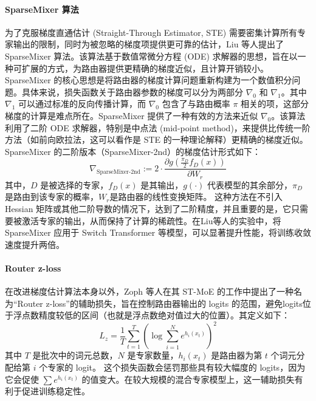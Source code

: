 \paragraph{SparseMixer 算法}
为了克服梯度直通估计 (Straight-Through Estimator, STE) 需要密集计算所有专家输出的限制，同时为被忽略的梯度项提供更可靠的估计，Liu 等人提出了 SparseMixer 算法\cite{liu2023sparsebackpropagationmoetraining}。该算法基于数值常微分方程 (ODE) 求解器的思想，旨在以一种可扩展的方式，为路由器提供更精确的梯度近似，且计算开销较小。SparseMixer 的核心思想是将路由器的梯度计算问题重新构建为一个数值积分问题。具体来说，损失函数关于路由器参数的梯度可以分为两部分 $\nabla_0$ 和 $\nabla_1$。其中 $\nabla_1$ 可以通过标准的反向传播计算，而 $\nabla_0$ 包含了与路由概率 $\pi$ 相关的项，这部分梯度的计算是难点所在。SparseMixer 提供了一种有效的方法来近似 $\nabla_0$。该算法利用了二阶 ODE 求解器，特别是中点法 (mid-point method)，来提供比传统一阶方法（如前向欧拉法，这可以看作是 STE 的一种理论解释）更精确的梯度近似。SparseMixer 的二阶版本（SparseMixer-2nd）的梯度估计形式如下：
\begin{equation}
\nabla_{\text{SparseMixer-2nd}} := 2 \cdot \frac{\partial g(\frac{\pi_D}{2} f_D(x))}{\partial W_r}
\end{equation}
其中，$D$ 是被选择的专家，$f_D(x)$ 是其输出，$g(\cdot)$ 代表模型的其余部分，$\pi_D$ 是路由到该专家的概率，$W_r$是路由器的线性变换矩阵。 这种方法在不引入 Hessian 矩阵或其他二阶导数的情况下，达到了二阶精度，并且重要的是，它只需要被激活专家的输出，从而保持了计算的稀疏性。在Liu等人的实验中，将 SparseMixer 应用于 Switch Transformer 等模型，可以显著提升性能，将训练收敛速度提升两倍。

\paragraph{Router z-loss}
在改进梯度估计算法本身以外，Zoph 等人在其 ST-MoE 的工作中提出了一种名为“Router z-loss”的辅助损失\cite{Zoph2022STMoEDS}，旨在控制路由器输出的 logits 的范围，避免logits位于浮点数精度较低的区间（也就是浮点数绝对值过大的位置）。其定义如下：
\begin{equation}
L_z = \frac{1}{T} \sum_{t=1}^{T} (\log \sum_{i=1}^{N} e^{h_i(x_t)})^2
\end{equation}
其中 $T$ 是批次中的词元总数，$N$ 是专家数量，$h_i(x_t)$ 是路由器为第 $t$ 个词元分配给第 $i$ 个专家的 logit。
这个损失函数会惩罚那些具有较大幅度的 logits，因为它会促使 $\sum e^{h_i(x_t)}$ 的值变大。在较大规模的混合专家模型上，这一辅助损失有利于促进训练稳定性。

